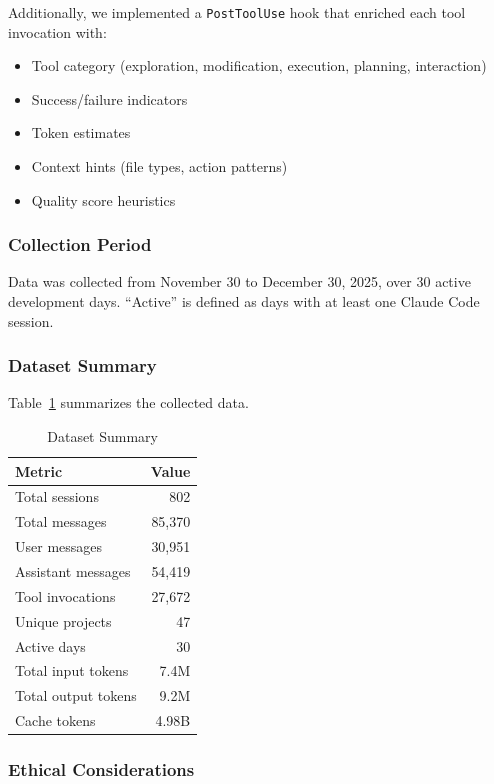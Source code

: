 Additionally, we implemented a \texttt{PostToolUse} hook that enriched each tool invocation with:
\begin{itemize}
    \item Tool category (exploration, modification, execution, planning, interaction)
    \item Success/failure indicators
    \item Token estimates
    \item Context hints (file types, action patterns)
    \item Quality score heuristics
\end{itemize}

\subsubsection{Collection Period}

Data was collected from November 30 to December 30, 2025, over 30 active development days. ``Active'' is defined as days with at least one Claude Code session.

\subsubsection{Dataset Summary}

Table~\ref{tab:dataset} summarizes the collected data.

\begin{table}[h]
\caption{Dataset Summary}
\label{tab:dataset}
\begin{tabular}{lr}
\toprule
\textbf{Metric} & \textbf{Value} \\
\midrule
Total sessions & 802 \\
Total messages & 85,370 \\
\quad User messages & 30,951 \\
\quad Assistant messages & 54,419 \\
Tool invocations & 27,672 \\
Unique projects & 47 \\
Active days & 30 \\
Total input tokens & 7.4M \\
Total output tokens & 9.2M \\
Cache tokens & 4.98B \\
\bottomrule
\end{tabular}
\end{table}

\subsubsection{Ethical Considerations}

